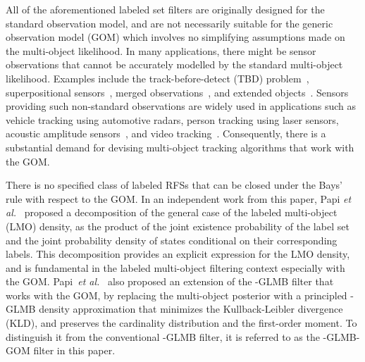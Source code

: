 \documentclass[journal]{IEEEtran}
\begin{document}
All of the aforementioned labeled set filters are originally designed  for the standard observation model, and are not necessarily suitable for the generic observation model (GOM) which involves no simplifying assumptions made on the multi-object likelihood. In many applications, there might be sensor observations that cannot be accurately modelled by the standard multi-object likelihood. Examples include
the   track-before-detect (TBD) problem~\cite{refr:MeMber_filter,refr:tbd-2,refr:tbd-3,refr:tbd-4,refr:tbd-5,haichao1,haichao2}, superpositional sensors~\cite{refr:superpositional-1, refr:superpositional-2, refr:superpositional-3, refr:label_7}, merged observations~\cite{refr:label_4}, and extended objects~\cite{refr:extended-1}. Sensors providing such non-standard observations are widely used in  applications such as 
vehicle tracking using automotive radars, person tracking using laser sensors, acoustic amplitude sensors~\cite{refr:amplitude},  
and video tracking~\cite{refr:computer-vision, refr:vedio-tracking}. Consequently, there is a substantial demand for devising  multi-object tracking algorithms that work with the GOM.

 
There is no specified class of labeled RFSs that can be closed under the Bays' rule with respect to the GOM. In an independent work from this paper, Papi \textit{et al.}~\cite{refr:label_6} proposed  a decomposition of the general case of the  labeled multi-object (LMO) density, as the product of the joint existence probability of the label set and the joint probability density of states conditional on their corresponding labels. This decomposition  provides an explicit expression for the  LMO density, and is  fundamental  in the labeled multi-object filtering context especially with  the GOM.
Papi~\textit{et al.}~\cite{refr:label_6} also proposed an extension of the -GLMB filter that  works with the GOM,  by replacing the multi-object posterior with a principled -GLMB density approximation that  minimizes the  Kullback-Leibler divergence (KLD), and preserves the cardinality distribution and the first-order moment.
To distinguish it from the conventional -GLMB filter, it is referred to as the -GLMB-GOM filter in this paper.
\end{document}
